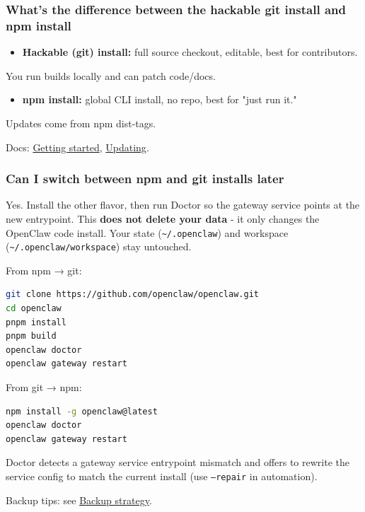\subsubsection{What's the difference between the hackable git install and npm install}


\begin{itemize}
  \item \textbf{Hackable (git) install:} full source checkout, editable, best for contributors.
\end{itemize}

You run builds locally and can patch code/docs.
\begin{itemize}
  \item \textbf{npm install:} global CLI install, no repo, best for "just run it."
\end{itemize}

Updates come from npm dist-tags.

Docs: \href{/start/getting-started}{Getting started}, \href{/install/updating}{Updating}.

\subsubsection{Can I switch between npm and git installs later}


Yes. Install the other flavor, then run Doctor so the gateway service points at the new entrypoint.
This \textbf{does not delete your data} - it only changes the OpenClaw code install. Your state
(\texttt{\textasciitilde{}/.openclaw}) and workspace (\texttt{\textasciitilde{}/.openclaw/workspace}) stay untouched.

From npm → git:

\begin{lstlisting}[language=bash]
git clone https://github.com/openclaw/openclaw.git
cd openclaw
pnpm install
pnpm build
openclaw doctor
openclaw gateway restart
\end{lstlisting}


From git → npm:

\begin{lstlisting}[language=bash]
npm install -g openclaw@latest
openclaw doctor
openclaw gateway restart
\end{lstlisting}


Doctor detects a gateway service entrypoint mismatch and offers to rewrite the service config to match the current install (use \texttt{--repair} in automation).

Backup tips: see \href{/help/faq\#whats-the-recommended-backup-strategy}{Backup strategy}.

